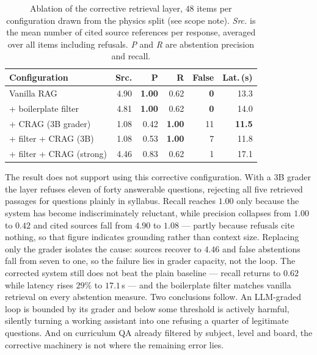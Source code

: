 \documentclass[conference]{IEEEtran}
\begin{document}
\begin{table}[htbp]
\caption{Ablation of the corrective retrieval layer, $48$ items per
configuration drawn from the physics split (see scope note).
\emph{Src.} is the mean number of cited source references per response,
averaged over all items including refusals. \emph{P} and \emph{R} are
abstention precision and recall.}
\label{tab:ablation}
\centering
\small
\setlength{\tabcolsep}{4pt}
\begin{tabular}{@{}lrrrrr@{}}
\toprule
\textbf{Configuration} & \textbf{Src.} & \textbf{P} & \textbf{R} & \textbf{False} & \textbf{Lat.\,(s)} \\
\midrule
Vanilla RAG              & 4.90 & \textbf{1.00} & 0.62 & \textbf{0}  & 13.3 \\
+ boilerplate filter     & 4.81 & \textbf{1.00} & 0.62 & \textbf{0}  & 14.0 \\
+ CRAG ($3$B grader)     & 1.08 & 0.42 & \textbf{1.00} & 11 & \textbf{11.5} \\
+ filter + CRAG ($3$B)   & 1.08 & 0.53 & \textbf{1.00} & 7  & 11.8 \\
+ filter + CRAG (strong) & 4.46 & 0.83 & 0.62 & 1  & 17.1 \\
\bottomrule
\end{tabular}
\end{table}

The result does not support using this corrective configuration. With a $3$B
grader the layer refuses eleven of forty answerable questions, rejecting all
five retrieved passages for questions plainly in syllabus. Recall reaches $1.00$
only because the system has become indiscriminately reluctant, while precision
collapses from $1.00$ to $0.42$ and cited sources fall from $4.90$ to $1.08$ ---
partly because refusals cite nothing, so that figure indicates grounding rather
than context size. Replacing only the grader isolates the cause: sources recover
to $4.46$ and false abstentions fall from seven to one, so the failure lies in
grader capacity, not the loop. The corrected system still does not beat the
plain baseline --- recall returns to $0.62$ while latency rises $29\%$ to
$17.1$\,s --- and the boilerplate filter matches vanilla retrieval on every
abstention measure. Two conclusions follow. An LLM-graded loop is bounded by its
grader and below some threshold is actively harmful, silently turning a working
assistant into one refusing a quarter of legitimate questions. And on curriculum
QA already filtered by subject, level and board, the corrective machinery is not
where the remaining error lies.
\end{document}

